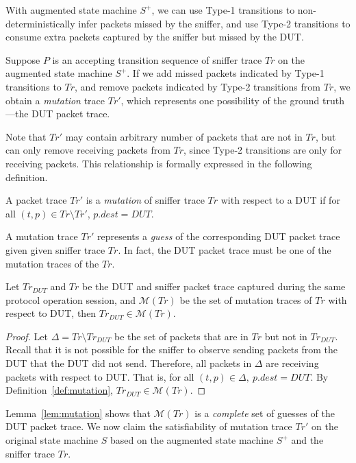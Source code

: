 With augmented state machine $S^+$, we can use Type-1 transitions to
non-deterministically infer packets missed by the sniffer, and use Type-2
transitions to consume extra
packets captured by the sniffer but missed by the DUT.

Suppose $P$ is an accepting transition sequence of sniffer trace $Tr$ on the
augmented state machine $S^+$.
%
If we add missed packets indicated by Type-1 transitions to $Tr$, and remove
packets indicated by Type-2 transitions from $Tr$, we obtain a \textit{mutation}
trace $Tr'$, which represents one possibility of the ground truth---the DUT
packet trace.

Note that $Tr'$ may contain arbitrary number of packets that are not in $Tr$,
but can only remove receiving packets from $Tr$, since Type-2 transitions are
only for receiving packets.
%
This relationship is formally expressed in the following definition.

\begin{definition}
  \label{def:mutation}
  A packet trace $Tr'$ is a \textit{mutation} of sniffer trace $Tr$ with respect
  to a DUT if for all $(t, p) \in Tr\setminus Tr'$, $p.dest = DUT$.
\end{definition}

A mutation trace $Tr'$ represents a \textit{guess} of the corresponding DUT
packet trace given given sniffer trace $Tr$.
%
In fact, the DUT packet trace must be one of the mutation traces of the $Tr$.

\begin{lemma}
  Let $Tr_{DUT}$ and $Tr$ be the DUT and sniffer packet trace captured during
  the same protocol operation session, and $\mathcal{M}(Tr)$ be the set of
  mutation traces of $Tr$ with respect to DUT, then $Tr_{DUT} \in \mathcal{M}(Tr)$.
  \label{lem:mutation}
\end{lemma}
\begin{proof}
  Let $\Delta = Tr \setminus Tr_{DUT}$ be the set of packets that are in $Tr$
  but not in $Tr_{DUT}$. Recall that it is not possible for the sniffer to
  observe sending packets from the DUT that the DUT did not send. Therefore,
  all packets in $\Delta$ are receiving packets with respect to DUT. That is, for
  all $(t, p) \in \Delta,\ p.dest = DUT$. By Definition~\ref{def:mutation},
  $Tr_{DUT} \in \mathcal{M}(Tr)$.
\end{proof}

Lemma~\ref{lem:mutation} shows that $\mathcal{M}(Tr)$ is a \textit{complete} set
of guesses of the DUT packet trace.
%
We now claim the satisfiability of mutation trace $Tr'$ on the original state
machine $S$ based on the augmented state machine $S^+$ and the sniffer trace
$Tr$.

